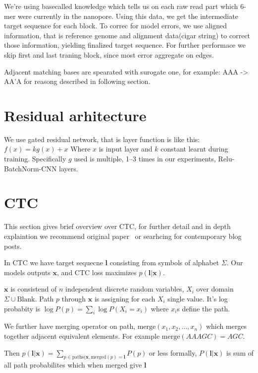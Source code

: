\documentclass[times, utf8, seminar, numeric]{fer}
\begin{document}
We're using basecalled knowledge which tells us on each raw read part which 6-mer were currently in the nanopore. Using this data, we get the intermediate target sequence for each block. To correc for model errors, we use aligned information, that is reference genome and alignment data(cigar string) to correct those information, yielding finalized target sequence. For further performace we skip first and last traning block, since most error aggregate on edges.

Adjacent matching bases are spearated with surogate one, for example: AAA -> AA'A for reasong described in following section.

\section{Residual arhitecture}

We use gated residual network, that is layer function is like this: $f(x) = k g(x) + x$ Where $x$ is input layer and $k$ constant learnt during training. Specifically $g$ used is multiple, 1--3 times in our experiments, Relu-BatchNorm-CNN layers.

\section{CTC}

This section gives brief overview over CTC, for further detail and in depth explaintion we recommend original paper~\cite{graves2006connectionist} or searhcing for contemporary blog posts.

In CTC we have target sequecne $\mathbf{l}$ consisting from symbols of alphabet $\Sigma$. Our models outputs $\mathbf{x}$, and CTC loss maximizes $p(\mathbf{l}|\mathbf{x})$.

$\mathbf{x}$ is consistend of $n$ independent discrete random variables, $X_i$  over domain $\Sigma \cup \text{Blank}$. Path $p$ through $\mathbf{x}$ is assigning for each $X_i$ single value. It's log probabity is $\log P(p) = \sum_i {\log P(X_i=x_i)}$ where $x_i$s define the path.

We further have merging operator on path, $\text{merge}(x_1, x_2, \ldots, x_n)$ which merges together adjacent equivalent elements. For example $\text{merge}(AAAGC) = AGC$.

Then $p(\mathbf{l}|\mathbf{x}) = \sum_{p\in\text{paths}(\mathbf{x}, \text{merged}(p) = \mathbf{l}}{P(p)}$ or less formally, $P(\mathbf{l}|\mathbf{x})$ is sum of all path probabilites which when merged give $\mathbf{l}$
\end{document}
